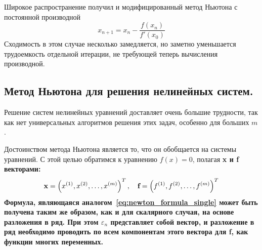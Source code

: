 \documentclass[../../calc-math-exam-2023.tex]{subfiles}
\begin{document}
    Широкое распространение получил и модифицированный метод Ньютона с постоянной производной
    \begin{equation}
        x_{n+1} = x_n - \frac{f(x_n)}{f'(x_0)}
    \end{equation}
    Сходимость в этом случае несколько замедляется, но заметно уменьшается трудоемкость отдельной итерации, не требующей
    теперь вычисления производной.

    \subsection{Метод Ньютона для решения нелинейных систем.}
    Решение систем нелинейных уравнений доставляет очень большие трудности, так как нет универсальных алгоритмов
    решения этих задач, особенно для больших $m$.

    Достоинством метода Ньютона является то, что он обобщается на системы уравнений. С этой целью обратимся к уравнению
    $f(x) = 0$, полагая \bf{x} и \bf{f} векторами:
    \begin{equation*}
        \bf{x} = \left( x^{(1)}, x^{(2)}, \ldots, x^{(m)} \right)^T, \quad \bf{f} = \left( f^{(1)}, f^{(2)}, \ldots, f^{(m)} \right)^T
    \end{equation*}
    Формула, являющаяся аналогом~\eqref{eq:newton_formula_single} может быть получена таким же образом, как и для
    скалярного случая, на основе разложения в ряд. При этом $\varepsilon_n$ представляет собой вектор, и разложение в
    ряд необходимо проводить по всем компонентам этого вектора для \bf{f}, как функции многих переменных.
\end{document}
